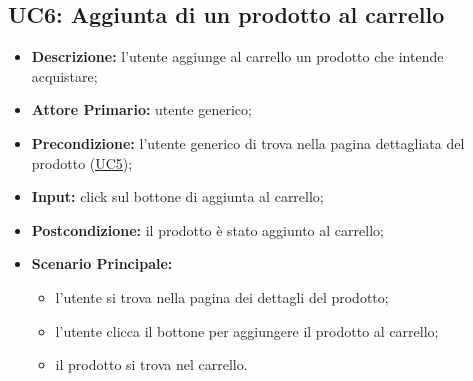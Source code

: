 \subsection{UC6: Aggiunta di un prodotto al carrello}
\label{sec:UC6}
\begin{itemize}
    \item \textbf{Descrizione:} l'utente aggiunge al carrello un prodotto che intende acquistare;
    \item \textbf{Attore Primario:} utente generico;
    \item \textbf{Precondizione:} l'utente generico di trova nella pagina dettagliata del prodotto (\hyperref[sec:UC5]{\underline{UC5}});
    \item \textbf{Input:} click sul bottone di aggiunta al carrello;
    \item \textbf{Postcondizione:} il prodotto è stato aggiunto al carrello;
    \item \textbf{Scenario Principale:}
          \begin{itemize}
              \item l'utente si trova nella pagina dei dettagli del prodotto;
              \item l'utente clicca il bottone per aggiungere il prodotto al carrello;
              \item il prodotto si trova nel carrello.
          \end{itemize}
\end{itemize}